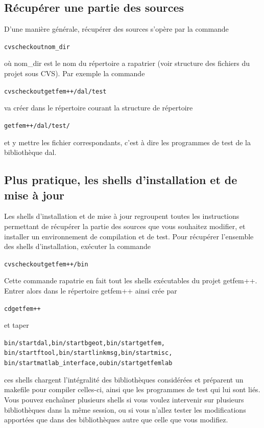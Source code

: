 \documentclass[12pt,a4paper]{../doc}
\begin{document}
{\subsection{R\'ecup\'erer une partie des sources}
D'une mani\`ere g\'en\'erale, r\'ecup\'erer des sources s'op\`ere par la commande
\begin{alltt}
  cvs checkout nom_dir
\end{alltt}
o\`u nom\_dir est le nom du r\'epertoire a rapatrier (voir structure des fichiers du projet sous CVS).
Par exemple la commande
\begin{alltt}
  cvs checkout getfem++/dal/test
\end{alltt}
va cr\'eer dans le r\'epertoire courant la structure de r\'epertoire \begin{alltt} getfem++/dal/test/ \end{alltt} et y mettre les fichier correspondants, c'est \`a dire les programmes de test de la biblioth\`eque dal.

\subsection{Plus pratique, les shells d'installation et de mise \`a jour}
Les shells d'installation et de mise \`a jour regroupent toutes les instructions permettant de r\'ecup\'erer la partie des sources que vous souhaitez modifier, et installer un environnement de compilation et de test. Pour r\'ecup\'erer l'ensemble des shells d'installation, ex\'ecuter la commande
\begin{alltt}
  cvs checkout getfem++/bin
\end{alltt}
Cette commande rapatrie en fait tout les shells ex\'ecutables du projet getfem++. Entrer alors dans le r\'epertoire getfem++ ainsi cr\'ee par
\begin{alltt} cd getfem++ \end{alltt}
et taper
\begin{alltt} 
  bin/startdal, bin/startbgeot, bin/startgetfem,
  bin/startftool, bin/startlinkmsg, bin/startmisc,
  bin/startmatlab_interface, ou bin/startgetfemlab
\end{alltt}
ces shells chargent l'int\'egralit\'e des biblioth\`eques consid\'er\'ees et pr\'eparent un makefile pour compiler celles-ci, ainsi que les programmes de test qui lui sont li\'es. Vous pouvez encha\^\i ner plusieurs shells si vous voulez intervenir sur plusieurs biblioth\`eques dans la m\^eme session, ou si vous n'allez tester les modifications apport\'ees que dans des biblioth\`eques autre que celle que vous modifiez.\\[0.4cm]

}
\end{document}
